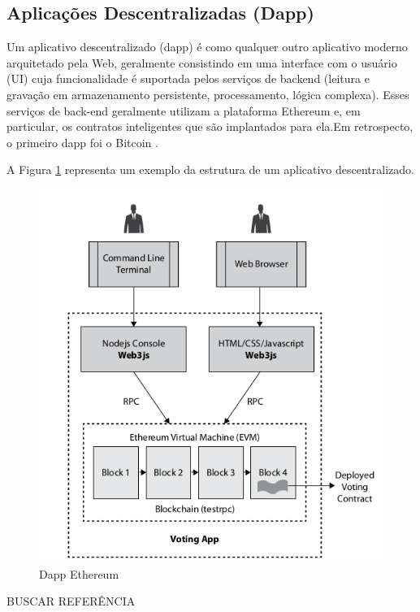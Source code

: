 \subsection{Aplicações Descentralizadas (Dapp)}

Um aplicativo descentralizado (dapp) é como qualquer outro aplicativo moderno arquitetado pela Web, geralmente consistindo em uma interface com o usuário (UI) cuja funcionalidade é suportada pelos serviços de backend (leitura e gravação em armazenamento persistente, processamento, lógica complexa). Esses serviços de back-end geralmente utilizam a plataforma Ethereum e, em particular, os contratos inteligentes que são implantados para ela.Em retrospecto, o primeiro dapp foi o Bitcoin \cite{blockchain_pratical_guide}.

A Figura \ref{fig:dapp_ethereum} representa um exemplo da estrutura de um aplicativo descentralizado.

    \begin{figure}[H]
         \centering
         \includegraphics[scale=0.5]{figuras/capitulo_2/ethereum_dapp_structure.png}
         \caption{Dapp Ethereum}
         \label{fig:dapp_ethereum}
    \end{figure}
    
    
    BUSCAR REFERÊNCIA